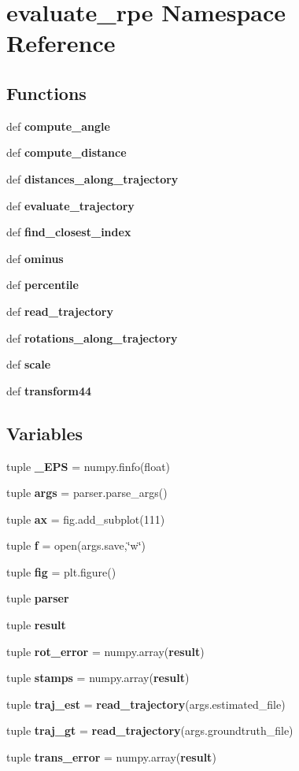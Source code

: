 \section{evaluate\-\_\-rpe \-Namespace \-Reference}
\label{namespaceevaluate__rpe}
\subsection*{\-Functions}
\begin{DoxyCompactItemize}
\item 
def {\bf compute\-\_\-angle}
\item 
def {\bf compute\-\_\-distance}
\item 
def {\bf distances\-\_\-along\-\_\-trajectory}
\item 
def {\bf evaluate\-\_\-trajectory}
\item 
def {\bf find\-\_\-closest\-\_\-index}
\item 
def {\bf ominus}
\item 
def {\bf percentile}
\item 
def {\bf read\-\_\-trajectory}
\item 
def {\bf rotations\-\_\-along\-\_\-trajectory}
\item 
def {\bf scale}
\item 
def {\bf transform44}
\end{DoxyCompactItemize}
\subsection*{\-Variables}
\begin{DoxyCompactItemize}
\item 
tuple {\bf \-\_\-\-E\-P\-S} = numpy.\-finfo(float)
\item 
tuple {\bf args} = parser.\-parse\-\_\-args()
\item 
tuple {\bf ax} = fig.\-add\-\_\-subplot(111)
\item 
tuple {\bf f} = open(args.\-save,\char`\"{}w\char`\"{})
\item 
tuple {\bf fig} = plt.\-figure()
\item 
tuple {\bf parser}
\item 
tuple {\bf result}
\item 
tuple {\bf rot\-\_\-error} = numpy.\-array({\bf result})
\item 
tuple {\bf stamps} = numpy.\-array({\bf result})
\item 
tuple {\bf traj\-\_\-est} = {\bf read\-\_\-trajectory}(args.\-estimated\-\_\-file)
\item 
tuple {\bf traj\-\_\-gt} = {\bf read\-\_\-trajectory}(args.\-groundtruth\-\_\-file)
\item 
tuple {\bf trans\-\_\-error} = numpy.\-array({\bf result})
\end{DoxyCompactItemize}


